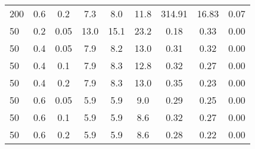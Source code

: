 \begin{tabular}{l c c c c c c c c }
200 & 0.6 & 0.2 & 7.3 & 8.0 & 11.8 & 314.91 & 16.83 & 0.07 \\
50 & 0.2 & 0.05 & 13.0 & 15.1 & 23.2 & 0.18 & 0.33 & 0.00 \\
50 & 0.4 & 0.05 & 7.9 & 8.2 & 13.0 & 0.31 & 0.32 & 0.00 \\
50 & 0.4 & 0.1 & 7.9 & 8.3 & 12.8 & 0.32 & 0.27 & 0.00 \\
50 & 0.4 & 0.2 & 7.9 & 8.3 & 13.0 & 0.35 & 0.23 & 0.00 \\
50 & 0.6 & 0.05 & 5.9 & 5.9 & 9.0 & 0.29 & 0.25 & 0.00 \\
50 & 0.6 & 0.1 & 5.9 & 5.9 & 8.6 & 0.32 & 0.27 & 0.00 \\
50 & 0.6 & 0.2 & 5.9 & 5.9 & 8.6 & 0.28 & 0.22 & 0.00 \\
\hline
\end{tabular}
